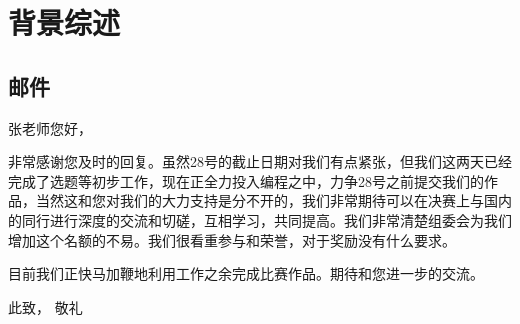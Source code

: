 \chapter{背景综述}

\section{邮件}
张老师您好，

非常感谢您及时的回复。虽然28号的截止日期对我们有点紧张，但我们这两天已经完成了选题等初步工作，现在正全力投入编程之中，力争28号之前提交我们的作品，当然这和您对我们的大力支持是分不开的，我们非常期待可以在决赛上与国内的同行进行深度的交流和切磋，互相学习，共同提高。我们非常清楚组委会为我们增加这个名额的不易。我们很看重参与和荣誉，对于奖励没有什么要求。

目前我们正快马加鞭地利用工作之余完成比赛作品。期待和您进一步的交流。

此致，
    敬礼


